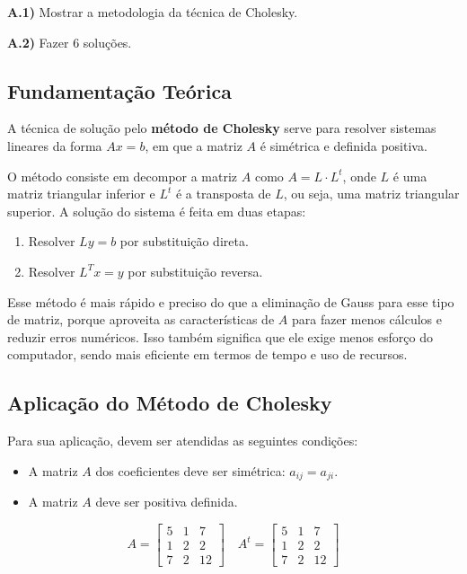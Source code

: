 \documentclass[12pt,a4paper]{article}
\begin{document}
\textbf{A.1)} Mostrar a metodologia da técnica de Cholesky.

\textbf{A.2)} Fazer 6 soluções.

\vspace{0.5cm}

\subsection{Fundamentação Teórica}

A técnica de solução pelo \textbf{método de Cholesky} serve para resolver sistemas lineares da forma \( Ax = b \), em que a matriz \( A \) é simétrica e definida positiva.

\vspace{0.3cm}
O método consiste em decompor a matriz \( A \) como \( A = L \cdot L^t \), onde \( L \) é uma matriz triangular inferior e \( L^t \) é a transposta de \( L \), ou seja, uma matriz triangular superior. A solução do sistema é feita em duas etapas:

\begin{enumerate}
    \item Resolver \( Ly = b \) por substituição direta.
    \item Resolver \( L^T x = y \) por substituição reversa.
\end{enumerate}

Esse método é mais rápido e preciso do que a eliminação de Gauss para esse tipo de matriz, porque aproveita as características de \( A \) para fazer menos cálculos e reduzir erros numéricos. Isso também significa que ele exige menos esforço do computador, sendo mais eficiente em termos de tempo e uso de recursos.

\subsection{Aplicação do Método de Cholesky}

Para sua aplicação, devem ser atendidas as seguintes condições:

\begin{itemize}
    \item A matriz $A$ dos coeficientes deve ser simétrica: $a_{ij} = a_{ji}$.
    \item A matriz $A$ deve ser positiva definida.
\end{itemize}

\[
A = \begin{bmatrix}
5 & 1 & 7 \\
1 & 2 & 2 \\
7 & 2 & 12
\end{bmatrix}
\quad
A^t = \begin{bmatrix}
5 & 1 & 7 \\
1 & 2 & 2 \\
7 & 2 & 12
\end{bmatrix}
\]
\end{document}
